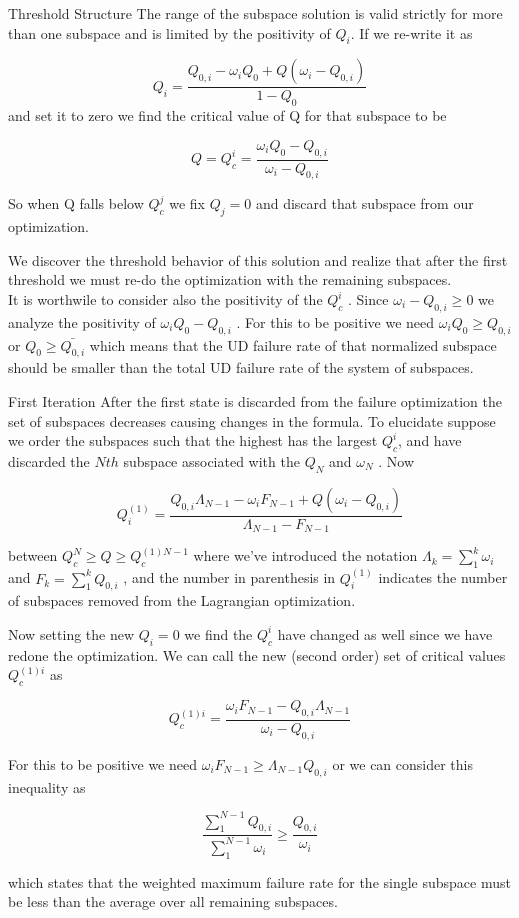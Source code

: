 \documentclass{beamer}
\begin{document}
\begin{frame}{Threshold Structure}
The range of the subspace solution is valid strictly for more than one subspace and is limited by the positivity of $Q_i$.
If we re-write it as

\[ Q_i = \frac{Q_{0,i} - \omega_i Q_0 + Q(\omega_i - Q_{0,i})}{1- Q_0}\] and set it to zero we find the critical value of Q for that subspace to be

\[Q= Q^i_c = \frac {\omega_i Q_0 - Q_{0,i}}{\omega_i- Q_{0,i}}\] 

So when Q falls below $Q^j_c$ we fix $Q_j = 0$ and discard that subspace from our optimization. 
\end{frame}
\begin{frame}
 We discover the threshold behavior of this solution and realize that after the first threshold we must re-do the optimization with the remaining subspaces. 
\[\]
It is worthwile to consider also the positivity of the $Q^i_c$ .  Since $\omega_i - Q_{0,i} \geq 0$ we analyze the positivity of $\omega_i Q_0 - Q_{0,i}$ . For this to be positive we need 
$\omega_iQ_0 \geq Q_{0,i}$ or $Q_0 \geq \bar{ Q_{0,i}}$ which means that the UD failure rate of that normalized subspace should be smaller than the total UD failure rate of the system of subspaces. 
\end{frame}
\begin{frame}{First Iteration}
 After the first state is discarded from the failure optimization the set of subspaces decreases causing changes in the formula.  To elucidate suppose we order the subspaces such that the highest has the largest $Q^i_c$, and have discarded the $Nth$ subspace associated with the $Q_N$ and $\omega_N$ . Now

\[  Q^{(1)}_i = \frac{ Q_{0,i}\Lambda_{N-1}  -  \omega_{i} F_{N-1} + Q( \omega_i - Q_{0,i} ) }{\Lambda_{N-1} - F_{N-1}}\]

between $Q^N_c \geq Q \geq Q^{(1)N-1}_c$ where we've introduced the notation $\Lambda_k = \sum_1^k \omega_i$ and $F_k = \sum_1^k Q_{0,i}$ , and the number in parenthesis in $Q^{(1)}_i$ indicates the number of subspaces removed from the Lagrangian optimization.
\end{frame}
\begin{frame}
Now setting the new $Q_i=0$ we find the $Q^i_c$ have changed as well since we have redone the optimization.  We can call the new (second order) set of critical values $Q^{(1)i}_c$ as

\[Q^{(1)i}_c = \frac{ \omega_{i} F_{N-1} -  Q_{0,i}\Lambda_{N-1}}{\omega_i - Q_{0,i}}\]

For this to be positive we need $\omega_i F_{N-1} \geq \Lambda_{N-1}Q_{0,i}$ or we can consider this inequality as

\[\frac{ \sum_1^{N-1} Q_{0,i}}{\sum_1^{N-1} \omega_i} \geq \frac{Q_{0,i}}{\omega_i}\] 

which states that the weighted maximum failure rate for the single subspace must be less than the average over all remaining subspaces.
\end{frame}
\end{document}
